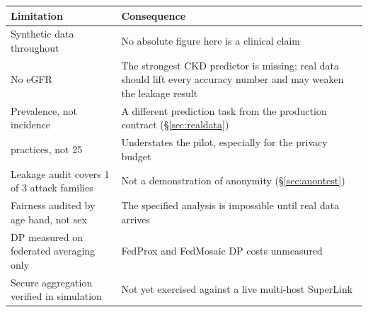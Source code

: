 \begin{center}
\small
\begin{tabular}{p{6.2cm}p{7.0cm}}
  \toprule
  Limitation & Consequence \\
  \midrule
  Synthetic data throughout & No absolute figure here is a clinical claim \\
  No eGFR & The strongest CKD predictor is missing; real data should lift every accuracy number and
            may weaken the leakage result \\
  Prevalence, not incidence & A different prediction task from the production contract
            (\S\ref{sec:realdata}) \\
  \NumPractices{} practices, not 25 & Understates the pilot, especially for the privacy budget \\
  Leakage audit covers 1 of 3 attack families & Not a demonstration of anonymity
            (\S\ref{sec:anontest}) \\
  Fairness audited by age band, not sex & The specified analysis is impossible until real data
            arrives \\
  DP measured on federated averaging only & FedProx and FedMosaic DP costs unmeasured \\
  Secure aggregation verified in simulation & Not yet exercised against a live multi-host SuperLink \\
  \bottomrule
\end{tabular}
\end{center}
